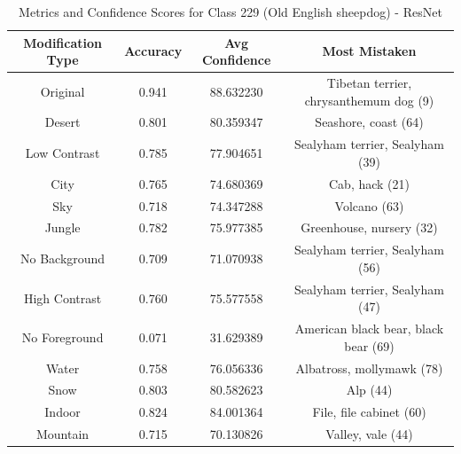 \begin{table}
	\centering
	\begin{tabular}{|c|c|c|c|}
		\hline
		\textbf{Modification Type} & \textbf{Accuracy} & \textbf{Avg Confidence} & \textbf{Most Mistaken} \\
		\hline
		Original & 0.941 & 88.632230 & Tibetan terrier, chrysanthemum dog (9) \\
		\hline
		Desert & 0.801 & 80.359347 & Seashore, coast (64) \\
		\hline
		Low Contrast & 0.785 & 77.904651 & Sealyham terrier, Sealyham (39) \\
		\hline
		City & 0.765 & 74.680369 & Cab, hack (21) \\
		\hline
		Sky & 0.718 & 74.347288 & Volcano (63) \\
		\hline
		Jungle & 0.782 & 75.977385 & Greenhouse, nursery (32) \\
		\hline
		No Background & 0.709 & 71.070938 & Sealyham terrier, Sealyham (56) \\
		\hline
		High Contrast & 0.760 & 75.577558 & Sealyham terrier, Sealyham (47) \\
		\hline
		No Foreground & 0.071 & 31.629389 & American black bear, black bear (69) \\
		\hline
		Water & 0.758 & 76.056336 & Albatross, mollymawk (78) \\
		\hline
		Snow & 0.803 & 80.582623 & Alp (44) \\
		\hline
		Indoor & 0.824 & 84.001364 & File, file cabinet (60) \\
		\hline
		Mountain & 0.715 & 70.130826 & Valley, vale (44) \\
		\hline
	\end{tabular}
	\caption{Metrics and Confidence Scores for Class 229 (Old English sheepdog) - ResNet}
	\label{tab:metrics_confidence_class_229_resnet}
\end{table}

